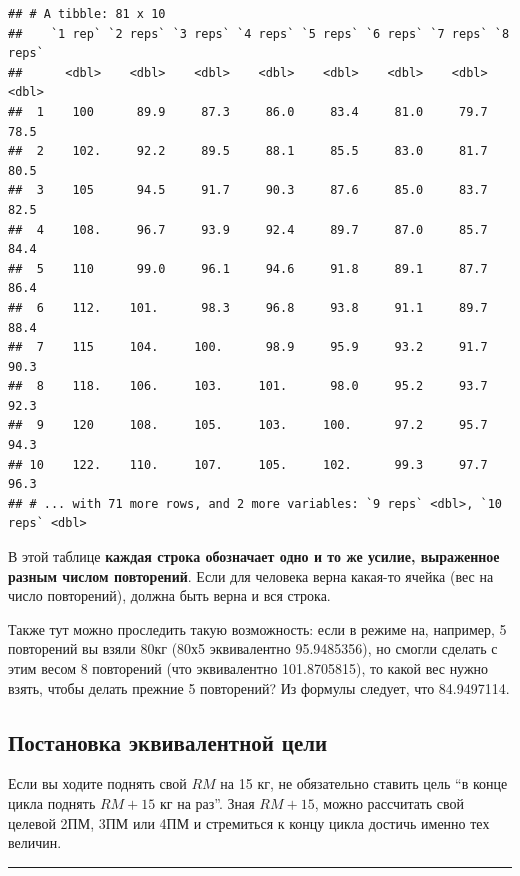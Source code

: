 \documentclass[
]{article}
\begin{document}
\begin{verbatim}
## # A tibble: 81 x 10
##    `1 rep` `2 reps` `3 reps` `4 reps` `5 reps` `6 reps` `7 reps` `8 reps`
##      <dbl>    <dbl>    <dbl>    <dbl>    <dbl>    <dbl>    <dbl>    <dbl>
##  1    100      89.9     87.3     86.0     83.4     81.0     79.7     78.5
##  2    102.     92.2     89.5     88.1     85.5     83.0     81.7     80.5
##  3    105      94.5     91.7     90.3     87.6     85.0     83.7     82.5
##  4    108.     96.7     93.9     92.4     89.7     87.0     85.7     84.4
##  5    110      99.0     96.1     94.6     91.8     89.1     87.7     86.4
##  6    112.    101.      98.3     96.8     93.8     91.1     89.7     88.4
##  7    115     104.     100.      98.9     95.9     93.2     91.7     90.3
##  8    118.    106.     103.     101.      98.0     95.2     93.7     92.3
##  9    120     108.     105.     103.     100.      97.2     95.7     94.3
## 10    122.    110.     107.     105.     102.      99.3     97.7     96.3
## # ... with 71 more rows, and 2 more variables: `9 reps` <dbl>, `10 reps` <dbl>
\end{verbatim}

В этой таблице \textbf{каждая строка обозначает одно и то же усилие,
выраженное разным числом повторений}. Если для человека верна какая-то
ячейка (вес на число повторений), должна быть верна и вся строка.

Также тут можно проследить такую возможность: если в режиме на,
например, 5 повторений вы взяли 80кг (80х5 эквивалентно 95.9485356), но
смогли сделать с этим весом 8 повторений (что эквивалентно 101.8705815),
то какой вес нужно взять, чтобы делать прежние 5 повторений? Из формулы
следует, что 84.9497114.

\hypertarget{ux43fux43eux441ux442ux430ux43dux43eux432ux43aux430-ux44dux43aux432ux438ux432ux430ux43bux435ux43dux442ux43dux43eux439-ux446ux435ux43bux438}{%
\subsection{Постановка эквивалентной
цели}\label{ux43fux43eux441ux442ux430ux43dux43eux432ux43aux430-ux44dux43aux432ux438ux432ux430ux43bux435ux43dux442ux43dux43eux439-ux446ux435ux43bux438}}

Если вы ходите поднять свой \(RM\) на 15 кг, не обязательно ставить цель
``в конце цикла поднять \(RM+15\) кг на раз''. Зная \(RM+15\), можно
рассчитать свой целевой 2ПМ, 3ПМ или 4ПМ и стремиться к концу цикла
достичь именно тех величин.

\begin{center}\rule{0.5\linewidth}{0.5pt}\end{center}
\end{document}
